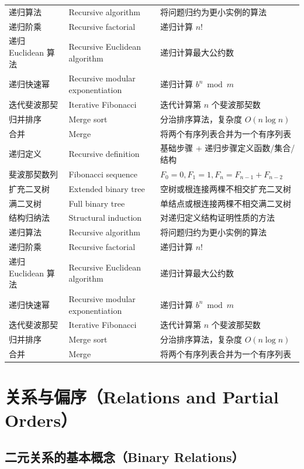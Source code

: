 \documentclass[UTF8,11pt,a4paper]{ctexbook}   %
\theoremstyle{definition}
\begin{document}
\begin{longtable}{|p{4.8cm}|p{4.8cm}|p{4.8cm}|}
递归算法 & Recursive algorithm & 将问题归约为更小实例的算法 \\
递归阶乘 & Recursive factorial & 递归计算 $n!$ \\
递归 Euclidean 算法 & Recursive Euclidean algorithm & 递归计算最大公约数 \\
递归快速幂 & Recursive modular exponentiation & 递归计算 $b^n \bmod m$ \\
迭代斐波那契 & Iterative Fibonacci & 迭代计算第 $n$ 个斐波那契数 \\
归并排序 & Merge sort & 分治排序算法，复杂度 $O(n \log n)$ \\
合并 & Merge & 将两个有序列表合并为一个有序列表 \\
\hline
递归定义 & Recursive definition & 基础步骤 + 递归步骤定义函数/集合/结构 \\
斐波那契数列 & Fibonacci sequence & $F_0=0,F_1=1,F_n=F_{n-1}+F_{n-2}$ \\
扩充二叉树 & Extended binary tree & 空树或根连接两棵不相交扩充二叉树 \\
满二叉树 & Full binary tree & 单结点或根连接两棵不相交满二叉树 \\
结构归纳法 & Structural induction & 对递归定义结构证明性质的方法 \\
递归算法 & Recursive algorithm & 将问题归约为更小实例的算法 \\
递归阶乘 & Recursive factorial & 递归计算 $n!$ \\
递归 Euclidean 算法 & Recursive Euclidean algorithm & 递归计算最大公约数 \\
递归快速幂 & Recursive modular exponentiation & 递归计算 $b^n \bmod m$ \\
迭代斐波那契 & Iterative Fibonacci & 迭代计算第 $n$ 个斐波那契数 \\
归并排序 & Merge sort & 分治排序算法，复杂度 $O(n \log n)$ \\
合并 & Merge & 将两个有序列表合并为一个有序列表 \\
\end{longtable}

\chapter{关系与偏序（Relations and Partial Orders）}

\section{二元关系的基本概念（Binary Relations）}
\end{document}

